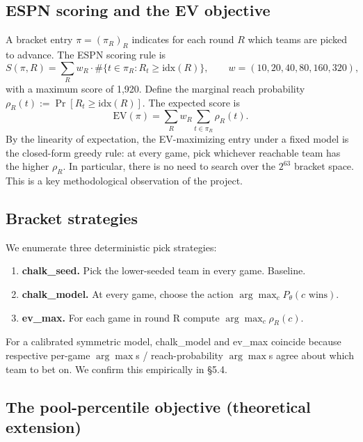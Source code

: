 \documentclass[12pt]{article}
\begin{document}
\subsection{ESPN scoring and the EV objective}

A bracket entry $\pi = (\pi_R)_R$ indicates for each round $R$ which teams are picked to advance. The ESPN scoring rule is
\begin{equation}
S(\pi, R) = \sum_R w_R \cdot \#\{t \in \pi_R : R_t \ge \mathrm{idx}(R)\},\qquad w = (10, 20, 40, 80, 160, 320),
\end{equation}
with a maximum score of 1{,}920. Define the marginal reach probability $\rho_R(t) := \Pr[R_t \ge \mathrm{idx}(R)]$. The expected score is
\begin{equation}
\mathrm{EV}(\pi) = \sum_R w_R \sum_{t \in \pi_R} \rho_R(t).
\end{equation}
By the linearity of expectation, the EV-maximizing entry under a fixed model is the closed-form greedy rule: at every game, pick whichever reachable team has the higher $\rho_R$. In particular, there is no need to search over the $2^{63}$ bracket space. This is a key methodological observation of the project.

\subsection{Bracket strategies}

We enumerate three deterministic pick strategies:

\begin{enumerate}[leftmargin=*]
\item \textbf{chalk\_seed.} Pick the lower-seeded team in every game. Baseline.
\item \textbf{chalk\_model.} At every game, choose the action $\arg\max_c P_\theta(c\text{ wins})$.
\item \textbf{ev\_max.} For each game in round R compute $\arg\max_c \rho_R(c)$.
\end{enumerate}

For a calibrated symmetric model, chalk\_model and ev\_max coincide because respective per-game $\arg\max$s / reach-probability $\arg\max$s agree about which team to bet on. We confirm this empirically in \S5.4.

\subsection{The pool-percentile objective (theoretical extension)}
\end{document}
